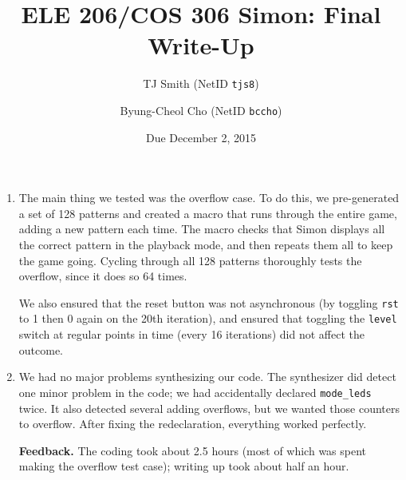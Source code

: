\documentclass[12pt]{article}
\title{ELE 206/COS 306 Simon: Final Write-Up}
\author{TJ Smith (NetID \texttt{tjs8})\and Byung-Cheol Cho (NetID \texttt{bccho})}
\date{Due December 2, 2015}
\begin{document}
\maketitle

\begin{enumerate}[label=\textbf{Question \arabic*.}]
%
\item The main thing we tested was the overflow case. To do this, we pre-generated a set of 128 patterns and created a macro that runs through the entire game, adding a new pattern each time. The macro checks that Simon displays all the correct pattern in the playback mode, and then repeats them all to keep the game going. Cycling through all 128 patterns thoroughly tests the overflow, since it does so 64 times.

We also ensured that the reset button was not asynchronous (by toggling \texttt{rst} to 1 then 0 again on the 20th iteration), and ensured that toggling the \texttt{level} switch at regular points in time (every 16 iterations) did not affect the outcome.
%
\item We had no major problems synthesizing our code. The synthesizer did detect one minor problem in the code; we had accidentally declared \texttt{mode\_leds} twice. It also detected several adding overflows, but we wanted those counters to overflow. After fixing the redeclaration, everything worked perfectly.
%
\item[\textbf{Feedback.}] The coding took about 2.5 hours (most of which was spent making the overflow test case); writing up took about half an hour.
%
\end{enumerate}
\end{document}
